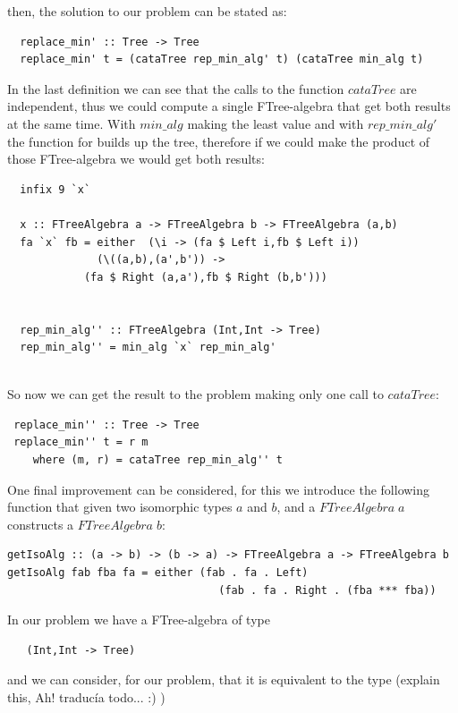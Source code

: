 \documentclass[a4paper,10pt]{article}
\begin{document}
\noindent then, the solution to our problem can be stated as:

\begin{lstlisting}
  replace_min' :: Tree -> Tree
  replace_min' t = (cataTree rep_min_alg' t) (cataTree min_alg t) 
\end{lstlisting}

In the last definition we can see that the calls to the function $cataTree$ are independent, thus
we could compute a single FTree-algebra that get both results at the same time. With $min\_alg$
making the least value and with $rep\_min\_alg'$ the function for builds up the tree, therefore if
we could make the product of those FTree-algebra we would get both results:

\begin{lstlisting}
  infix 9 `x`

  x :: FTreeAlgebra a -> FTreeAlgebra b -> FTreeAlgebra (a,b)
  fa `x` fb = either  (\i -> (fa $ Left i,fb $ Left i))
		      (\((a,b),(a',b')) -> 
			(fa $ Right (a,a'),fb $ Right (b,b')))
			  

  rep_min_alg'' :: FTreeAlgebra (Int,Int -> Tree)
  rep_min_alg'' = min_alg `x` rep_min_alg'
  
\end{lstlisting}

So now we can get the result to the problem making only one call to $cataTree$:

\begin{lstlisting}
 replace_min'' :: Tree -> Tree
 replace_min'' t = r m
    where (m, r) = cataTree rep_min_alg'' t
\end{lstlisting}

One final improvement can be considered, for this we introduce the following
function that given two isomorphic types $a$ and $b$, and a $FTreeAlgebra\;a$ 
constructs a $FTreeAlgebra\;b$:

\begin{lstlisting}
getIsoAlg :: (a -> b) -> (b -> a) -> FTreeAlgebra a -> FTreeAlgebra b
getIsoAlg fab fba fa = either (fab . fa . Left)
                                 (fab . fa . Right . (fba *** fba))
\end{lstlisting}

In our problem we have a FTree-algebra of type
  
\begin{lstlisting}
   (Int,Int -> Tree)
\end{lstlisting}

and we can consider, for our problem, that it is equivalent to the type
(explain this, Ah! traducía todo... :) )
\end{document}
